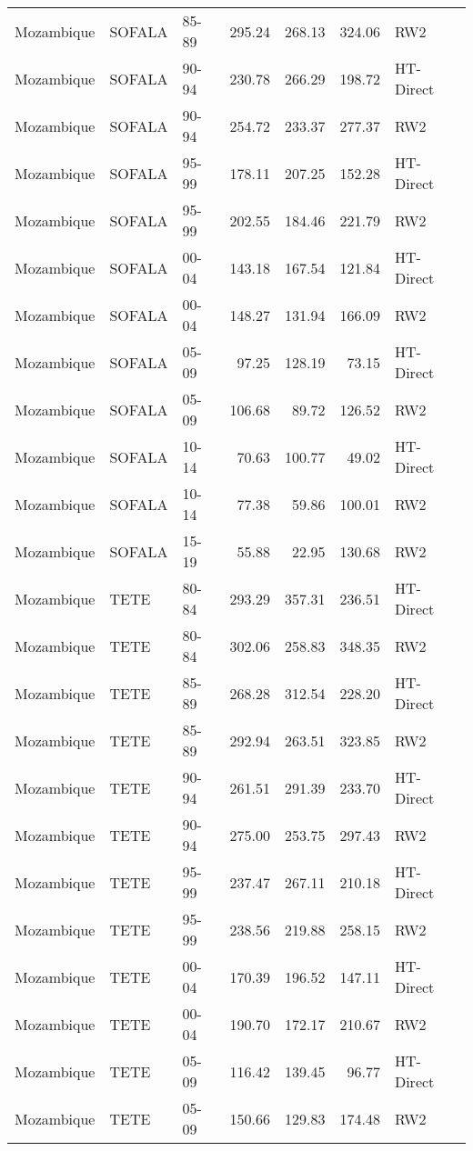 \begin{longtable}{lllrrrl}
  Mozambique & SOFALA & 85-89 & 295.24 & 268.13 & 324.06 & RW2 \\ 
  Mozambique & SOFALA & 90-94 & 230.78 & 266.29 & 198.72 & HT-Direct \\ 
  Mozambique & SOFALA & 90-94 & 254.72 & 233.37 & 277.37 & RW2 \\ 
  Mozambique & SOFALA & 95-99 & 178.11 & 207.25 & 152.28 & HT-Direct \\ 
  Mozambique & SOFALA & 95-99 & 202.55 & 184.46 & 221.79 & RW2 \\ 
  Mozambique & SOFALA & 00-04 & 143.18 & 167.54 & 121.84 & HT-Direct \\ 
  Mozambique & SOFALA & 00-04 & 148.27 & 131.94 & 166.09 & RW2 \\ 
  Mozambique & SOFALA & 05-09 & 97.25 & 128.19 & 73.15 & HT-Direct \\ 
  Mozambique & SOFALA & 05-09 & 106.68 & 89.72 & 126.52 & RW2 \\ 
  Mozambique & SOFALA & 10-14 & 70.63 & 100.77 & 49.02 & HT-Direct \\ 
  Mozambique & SOFALA & 10-14 & 77.38 & 59.86 & 100.01 & RW2 \\ 
  Mozambique & SOFALA & 15-19 & 55.88 & 22.95 & 130.68 & RW2 \\ 
  Mozambique & TETE & 80-84 & 293.29 & 357.31 & 236.51 & HT-Direct \\ 
  Mozambique & TETE & 80-84 & 302.06 & 258.83 & 348.35 & RW2 \\ 
  Mozambique & TETE & 85-89 & 268.28 & 312.54 & 228.20 & HT-Direct \\ 
  Mozambique & TETE & 85-89 & 292.94 & 263.51 & 323.85 & RW2 \\ 
  Mozambique & TETE & 90-94 & 261.51 & 291.39 & 233.70 & HT-Direct \\ 
  Mozambique & TETE & 90-94 & 275.00 & 253.75 & 297.43 & RW2 \\ 
  Mozambique & TETE & 95-99 & 237.47 & 267.11 & 210.18 & HT-Direct \\ 
  Mozambique & TETE & 95-99 & 238.56 & 219.88 & 258.15 & RW2 \\ 
  Mozambique & TETE & 00-04 & 170.39 & 196.52 & 147.11 & HT-Direct \\ 
  Mozambique & TETE & 00-04 & 190.70 & 172.17 & 210.67 & RW2 \\ 
  Mozambique & TETE & 05-09 & 116.42 & 139.45 & 96.77 & HT-Direct \\ 
  Mozambique & TETE & 05-09 & 150.66 & 129.83 & 174.48 & RW2 \\ 

\end{longtable}
